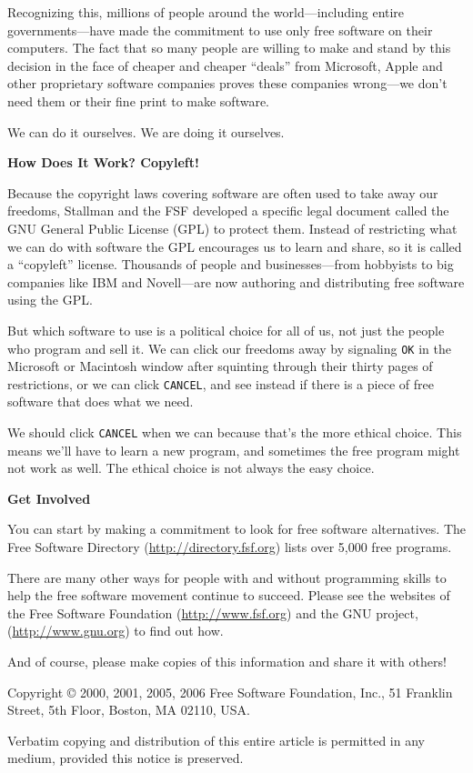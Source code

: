\documentclass[twoside,12pt]{article}
\begin{document}
Recognizing this, millions of people around the world---including entire
governments---have made the commitment to use only free software on their
computers. The fact that so many people are willing to make and stand by this
decision in the face of cheaper and cheaper ``deals'' from Microsoft, Apple and
other proprietary software companies proves these companies wrong---we don't
need them or their fine print to make software.

We can do it ourselves. We are doing it ourselves.

\begin{center}
{\Large\bf How Does It Work? Copyleft!}
\end{center}

Because the copyright laws covering software are often used to take away our
freedoms, Stallman and the FSF developed a specific legal document called the
GNU General Public License (GPL) to protect them. Instead of restricting what
we can do with software the GPL encourages us to learn and share, so it is
called a ``copyleft'' license. Thousands of people and businesses---from
hobbyists to big companies like IBM and Novell---are now authoring and
distributing free software using the GPL.

But which software to use is a political choice for all of us, not just the
people who program and sell it. We can click our freedoms away by signaling
{\tt OK} in the Microsoft or Macintosh window after squinting through their
thirty pages of restrictions, or we can click {\tt CANCEL}, and see instead if
there is a piece of free software that does what we need.

We should click {\tt CANCEL} when we can because that's the more ethical choice.
This means we'll have to learn a new program, and sometimes the free program
might not work as well. The ethical choice is not always the easy choice.

\begin{center}
{\Large\bf Get Involved}
\end{center}

You can start by making a commitment to look for free software alternatives.
The Free Software Directory (\url{http://directory.fsf.org}) lists over 5,000 free
programs.

There are many other ways for people with and without programming skills to
help the free software movement continue to succeed. Please see the websites of
the Free Software Foundation (\url{http://www.fsf.org}) and the GNU project,
(\url{http://www.gnu.org}) to find out how.

And of course, please make copies of this information and share it with
others!

\vspace{0.3in}

{\small

\noindent Copyright \copyright\/ 2000, 2001, 2005, 2006 Free Software Foundation, Inc., 51
Franklin Street, 5th Floor, Boston, MA 02110, USA.

Verbatim copying and distribution of this entire article is permitted
in any medium, provided this notice is preserved.
}
\end{document}
